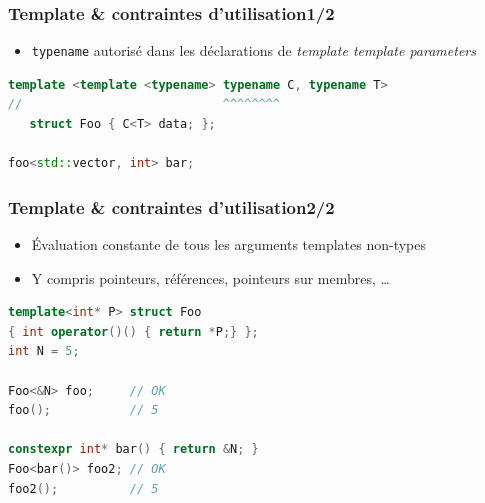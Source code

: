 \documentclass[C++.tex]{subfiles}
\begin{document}
\begin{frame}[fragile]
	\frametitle{Template \& contraintes d'utilisation\titlehfill{}1/2}
	\begin{itemize}
		\item \lstinline|typename| autorisé dans les déclarations de \textit{template template parameters}
	\end{itemize}

	\begin{lstlisting}[language=C++]
template <template <typename> typename C, typename T>
//                            ^^^^^^^^
   struct Foo { C<T> data; };

foo<std::vector, int> bar;\end{lstlisting}

\end{frame}

\begin{frame}[fragile]
	\frametitle{Template \& contraintes d'utilisation\titlehfill{}2/2}
	\begin{itemize}
		\item Évaluation constante de tous les arguments templates \og non-types\fg{}
		\item Y compris pointeurs, références, pointeurs sur membres, \ldots
	\end{itemize}

	\begin{lstlisting}[language=C++]
template<int* P> struct Foo
{ int operator()() { return *P;} };
int N = 5;

Foo<&N> foo;     // OK
foo();           // 5

constexpr int* bar() { return &N; }
Foo<bar()> foo2; // OK
foo2();          // 5\end{lstlisting}
\end{frame}
\end{document}
